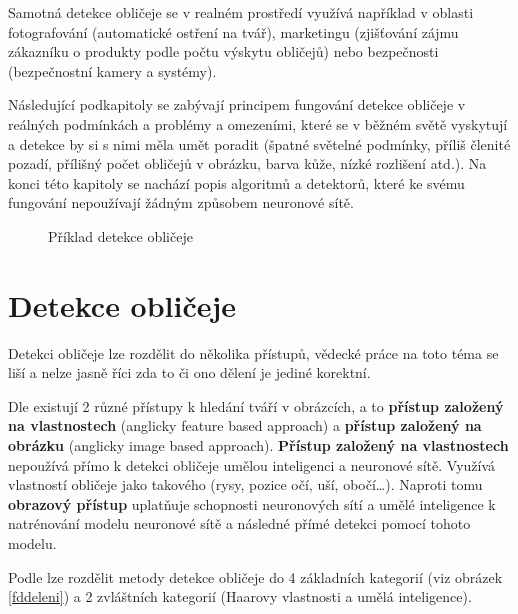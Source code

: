 Samotná detekce obličeje se v realném prostředí využívá například v oblasti fotografování (automatické ostření na tvář), marketingu (zjišťování zájmu zákazníku o produkty podle počtu výskytu obličejů) nebo bezpečnosti (bezpečnostní kamery a systémy).

Následující podkapitoly se zabývají principem fungování detekce obličeje v reálných podmínkách a problémy a omezeními, které se v běžném světě vyskytují a detekce by si s nimi měla umět poradit (špatné světelné podmínky, příliš členité pozadí, přílišný počet obličejů v obrázku, barva kůže, nízké rozlišení atd.). Na konci této kapitoly se nachází popis algoritmů a detektorů, které ke svému fungování nepoužívají žádným způsobem neuronové sítě.

\begin{figure}[H]
  \begin{center}
  \label{fdexample}
  \caption{Příklad detekce obličeje}
  \end{center}
\end{figure}

\section{Detekce obličeje}
Detekci obličeje lze rozdělit do několika přístupů, vědecké práce na toto téma se liší a nelze jasně říci zda to či ono dělení je jediné korektní.

Dle \cite{fdReview} existují 2 různé přístupy k hledání tváří v obrázcích, a to \textbf{přístup založený na vlastnostech} (anglicky feature based approach) a \textbf{přístup založený na obrázku} (anglicky image based approach). 
\textbf{Přístup založený na vlastnostech} nepoužívá přímo k detekci obličeje umělou inteligenci a neuronové sítě. Využívá vlastností obličeje jako takového (rysy, pozice očí, uší, obočí\dots).
Naproti tomu \textbf{obrazový přístup} uplatňuje schopnosti neuronových sítí a umělé inteligence k natrénování modelu neuronové sítě a následné přímé detekci pomocí tohoto modelu.

Podle \cite{feature-based-fd-review} lze rozdělit metody detekce obličeje do 4 základních kategorií (viz obrázek \ref{fddeleni}) a 2 zvláštních kategorií (Haarovy vlastnosti a umělá inteligence).

